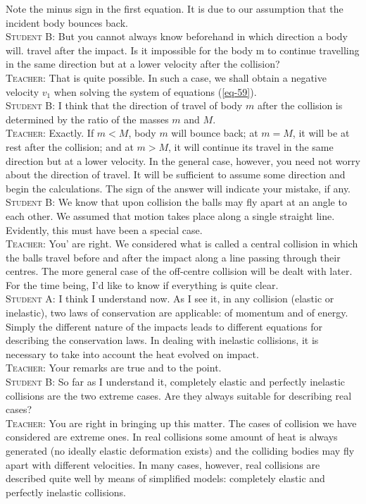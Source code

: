 \documentclass[a4paper,sfsidenotes]{tufte-book}
\begin{document}
Note the minus sign in the first equation. It is due to our assumption that the incident body bounces back.
\\
\textsc{Student B:} But you cannot always know beforehand in which direction a body will. travel after the impact. Is it impossible for the body m to continue travelling in the same direction but at a lower velocity after the collision?
\\
\textsc{Teacher:} That is quite possible. In such a case, we shall obtain a negative velocity $v_{1}$ when solving the system of equations (\ref{eq-59}).
\\
\textsc{Student B:} I think that the direction of travel of body $m$ after the collision is determined by the ratio of the masses $m$ and $M$.
\\
\textsc{Teacher:} Exactly. If $m<M$, body $m$ will bounce back; at $m=M$, it will be at rest after the collision; and at $m>M$, it will continue its travel in the same direction but at a lower velocity. In the general case, however, you need not worry about the direction of travel. It will be sufficient to assume
some direction and begin the calculations. The sign of the answer will indicate your mistake, if any.
\\
\textsc{Student B:} We know that upon collision the balls may fly apart at an angle to each other. We assumed that motion takes place along a single straight line. Evidently, this must have been a special case.
\\
\textsc{Teacher:} You' are right. We considered what is called a central collision in which the balls travel before and after the impact along a line passing through their centres. The more general case of the off-centre collision will be dealt with later. For the time being, I'd like to know if everything is quite clear.
\\
\textsc{Student A:} I think I understand now. As I see it, in any collision (elastic or inelastic), two laws of conservation are applicable: of momentum and of energy. Simply the different nature of the impacts leads to different equations for describing the conservation laws. In dealing with inelastic collisions,
it is necessary to take into account the heat evolved on impact.
\\
\textsc{Teacher:} Your remarks are true and to the point.
\\
\textsc{Student B:} So far as I understand it, completely elastic and perfectly inelastic collisions are the two extreme cases. Are they always suitable for describing real cases?
\\
\textsc{Teacher:} You are right in bringing up this matter. The cases of collision we have considered are extreme ones. In real collisions some amount of heat is always generated (no ideally elastic deformation exists) and the colliding bodies may fly apart with different velocities. In many cases, however, real
collisions are described quite well by means of simplified models: completely elastic and perfectly inelastic collisions.
\end{document}

